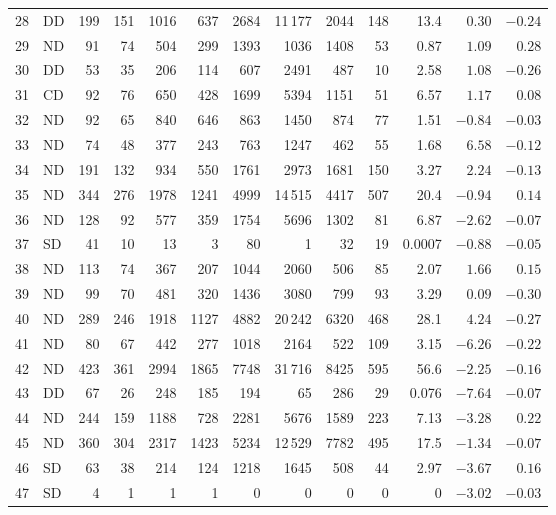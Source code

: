 \documentclass[11pt,a4paper]{article}
\begin{document}
\begin{longtable}{rlrrrrrrrrrrr}
28 & DD & 199 & 151 & 1016 &  637 &  2684 & 11\,177 &  2044 &  148 & 13.4  &  $0.30$ & $-0.24$ \\
29 & ND &  91 &  74 &  504 &  299 &  1393 &  1036 &  1408 &   53 &  0.87 &  $1.09$ &  $0.28$ \\
30 & DD &  53 &  35 &  206 &  114 &   607 &  2491 &   487 &   10 &  2.58 &  $1.08$ & $-0.26$ \\
31 & CD &  92 &  76 &  650 &  428 &  1699 &  5394 &  1151 &   51 &  6.57 &  $1.17$ &  $0.08$ \\
32 & ND &  92 &  65 &  840 &  646 &   863 &  1450 &   874 &   77 &  1.51 & $-0.84$ & $-0.03$ \\
33 & ND &  74 &  48 &  377 &  243 &   763 &  1247 &   462 &   55 &  1.68 &  $6.58$ & $-0.12$ \\
34 & ND & 191 & 132 &  934 &  550 &  1761 &  2973 &  1681 &  150 &  3.27 &  $2.24$ & $-0.13$ \\
35 & ND & 344 & 276 & 1978 & 1241 &  4999 & 14\,515 &  4417 &  507 & 20.4  & $-0.94$ &  $0.14$ \\
36 & ND & 128 &  92 &  577 &  359 &  1754 &  5696 &  1302 &   81 &  6.87 & $-2.62$ & $-0.07$ \\
37 & SD &  41 &  10 &   13 &    3 &    80 &     1 &    32 &   19 &  0.0007 & $-0.88$ & $-0.05$ \\
38 & ND & 113 &  74 &  367 &  207 &  1044 &  2060 &   506 &   85 &  2.07 &  $1.66$ &  $0.15$ \\
39 & ND &  99 &  70 &  481 &  320 &  1436 &  3080 &   799 &   93 &  3.29 &  $0.09$ & $-0.30$ \\
40 & ND & 289 & 246 & 1918 & 1127 &  4882 & 20\,242 &  6320 &  468 & 28.1  &  $4.24$ & $-0.27$ \\
41 & ND &  80 &  67 &  442 &  277 &  1018 &  2164 &   522 &  109 &  3.15 & $-6.26$ & $-0.22$ \\
42 & ND & 423 & 361 & 2994 & 1865 &  7748 & 31\,716 &  8425 &  595 & 56.6  & $-2.25$ & $-0.16$ \\
43 & DD &  67 &  26 &  248 &  185 &   194 &    65 &   286 &   29 &  0.076 & $-7.64$ & $-0.07$ \\
44 & ND & 244 & 159 & 1188 &  728 &  2281 &  5676 &  1589 &  223 &  7.13 & $-3.28$ &  $0.22$ \\
45 & ND & 360 & 304 & 2317 & 1423 &  5234 & 12\,529 &  7782 &  495 & 17.5  & $-1.34$ & $-0.07$ \\
46 & SD &  63 &  38 &  214 &  124 &  1218 &  1645 &   508 &   44 &  2.97 & $-3.67$ &  $0.16$ \\
47 & SD &   4 &   1 &    1 &    1 &     0 &     0 &     0 &    0 &  0    & $-3.02$ & $-0.03$ \\

\end{longtable}
\end{document}

